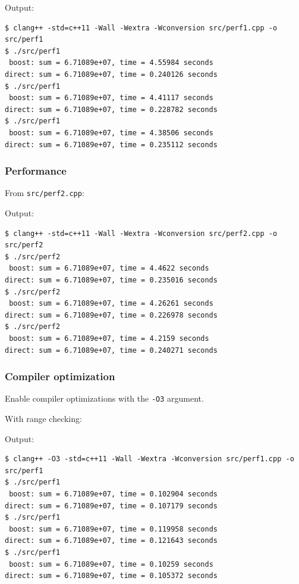 \documentclass[12pt,letterpaper,twoside]{article}
\begin{document}
Output:

\begin{verbatim}
$ clang++ -std=c++11 -Wall -Wextra -Wconversion src/perf1.cpp -o src/perf1
$ ./src/perf1
 boost: sum = 6.71089e+07, time = 4.55984 seconds
direct: sum = 6.71089e+07, time = 0.240126 seconds
$ ./src/perf1
 boost: sum = 6.71089e+07, time = 4.41117 seconds
direct: sum = 6.71089e+07, time = 0.228782 seconds
$ ./src/perf1
 boost: sum = 6.71089e+07, time = 4.38506 seconds
direct: sum = 6.71089e+07, time = 0.235112 seconds
\end{verbatim}

\hypertarget{performance-1}{%
\subsubsection{Performance}\label{performance-1}}

From \texttt{src/perf2.cpp}:

\begin{Shaded}
\begin{Highlighting}[]
\end{Highlighting}
\end{Shaded}

Output:

\begin{verbatim}
$ clang++ -std=c++11 -Wall -Wextra -Wconversion src/perf2.cpp -o src/perf2
$ ./src/perf2
 boost: sum = 6.71089e+07, time = 4.4622 seconds
direct: sum = 6.71089e+07, time = 0.235016 seconds
$ ./src/perf2
 boost: sum = 6.71089e+07, time = 4.26261 seconds
direct: sum = 6.71089e+07, time = 0.226978 seconds
$ ./src/perf2
 boost: sum = 6.71089e+07, time = 4.2159 seconds
direct: sum = 6.71089e+07, time = 0.240271 seconds
\end{verbatim}

\hypertarget{compiler-optimization}{%
\subsubsection{Compiler optimization}\label{compiler-optimization}}

Enable compiler optimizations with the \texttt{-O3} argument.

With range checking:

Output:

\begin{verbatim}
$ clang++ -O3 -std=c++11 -Wall -Wextra -Wconversion src/perf1.cpp -o src/perf1
$ ./src/perf1
 boost: sum = 6.71089e+07, time = 0.102904 seconds
direct: sum = 6.71089e+07, time = 0.107179 seconds
$ ./src/perf1
 boost: sum = 6.71089e+07, time = 0.119958 seconds
direct: sum = 6.71089e+07, time = 0.121643 seconds
$ ./src/perf1
 boost: sum = 6.71089e+07, time = 0.10259 seconds
direct: sum = 6.71089e+07, time = 0.105372 seconds
\end{verbatim}
\end{document}
